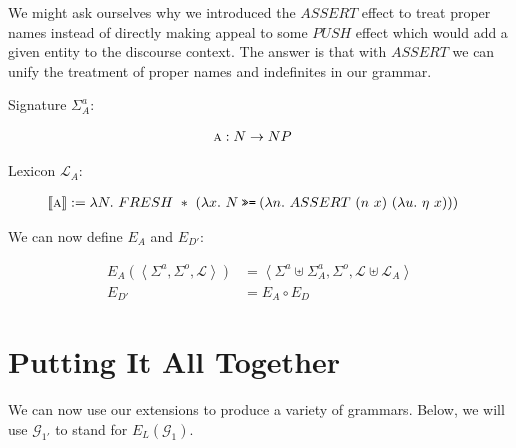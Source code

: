 \documentclass{article}
\newcommand{\hsbind}{\mathbin{\texttt{>>=}}}
\newcommand{\abs}[1]{\textsc{#1}}
\newcommand{\sem}[1]{\llbracket #1 \rrbracket}
\newcommand{\lex}[2]{\sem{\abs{#1}} &:= #2}
\begin{document}
We might ask ourselves why we introduced the $ASSERT$ effect to treat
proper names instead of directly making appeal to some $PUSH$ effect which
would add a given entity to the discourse context. The answer is that with
$ASSERT$ we can unify the treatment of proper names and indefinites in our
grammar.

Signature $\Sigma^a_A$:

\begin{align*}
  \abs{a} &: N \to NP
\end{align*}

Lexicon $\mathcal{L}_A$:

\begin{align*}
  \lex{a}{\lambda N.\ FRESH\ *\ (\lambda x.\ N \hsbind (\lambda n.\ ASSERT\ (n\ x)\ (\lambda u.\ \eta\ x)))}
\end{align*}

We can now define $E_A$ and $E_{D'}$:

\begin{align*}
E_A(\left< \Sigma^a, \Sigma^o, \mathcal{L} \right>) &= \left< \Sigma^a \uplus \Sigma^a_A, \Sigma^o, \mathcal{L} \uplus \mathcal{L}_A \right> \\
E_{D'} &= E_A \circ E_D
\end{align*}



\section{Putting It All Together}

We can now use our extensions to produce a variety of grammars. Below, we
will use $\mathcal{G}_{1'}$ to stand for $E_L(\mathcal{G}_1)$.
\end{document}
